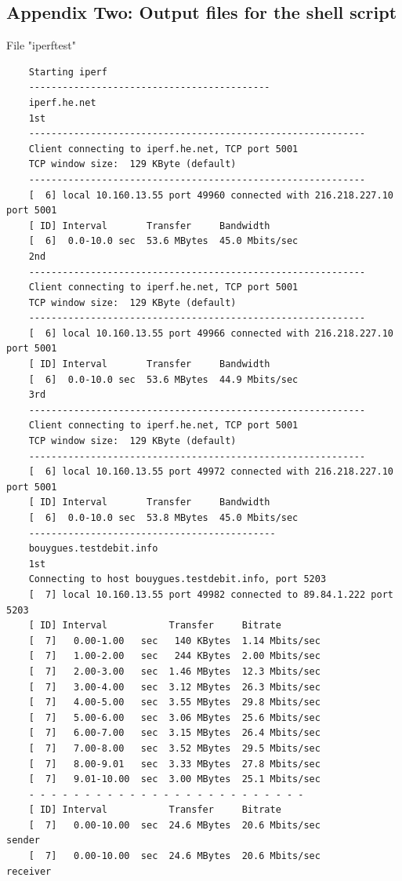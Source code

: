 \documentclass[paper=a4, fontsize=10pt]{scrartcl} %
\numberwithin{equation}{section} %
\numberwithin{figure}{section} %
\numberwithin{table}{section} %
\begin{document}
\subsection*{Appendix Two: Output files for the shell script}
File "iperftest"
\begin{lstlisting}
    Starting iperf
    -------------------------------------------
    iperf.he.net
    1st
    ------------------------------------------------------------
    Client connecting to iperf.he.net, TCP port 5001
    TCP window size:  129 KByte (default)
    ------------------------------------------------------------
    [  6] local 10.160.13.55 port 49960 connected with 216.218.227.10 port 5001
    [ ID] Interval       Transfer     Bandwidth
    [  6]  0.0-10.0 sec  53.6 MBytes  45.0 Mbits/sec
    2nd
    ------------------------------------------------------------
    Client connecting to iperf.he.net, TCP port 5001
    TCP window size:  129 KByte (default)
    ------------------------------------------------------------
    [  6] local 10.160.13.55 port 49966 connected with 216.218.227.10 port 5001
    [ ID] Interval       Transfer     Bandwidth
    [  6]  0.0-10.0 sec  53.6 MBytes  44.9 Mbits/sec
    3rd
    ------------------------------------------------------------
    Client connecting to iperf.he.net, TCP port 5001
    TCP window size:  129 KByte (default)
    ------------------------------------------------------------
    [  6] local 10.160.13.55 port 49972 connected with 216.218.227.10 port 5001
    [ ID] Interval       Transfer     Bandwidth
    [  6]  0.0-10.0 sec  53.8 MBytes  45.0 Mbits/sec
    --------------------------------------------
    bouygues.testdebit.info
    1st
    Connecting to host bouygues.testdebit.info, port 5203
    [  7] local 10.160.13.55 port 49982 connected to 89.84.1.222 port 5203
    [ ID] Interval           Transfer     Bitrate
    [  7]   0.00-1.00   sec   140 KBytes  1.14 Mbits/sec                  
    [  7]   1.00-2.00   sec   244 KBytes  2.00 Mbits/sec                  
    [  7]   2.00-3.00   sec  1.46 MBytes  12.3 Mbits/sec                  
    [  7]   3.00-4.00   sec  3.12 MBytes  26.3 Mbits/sec                  
    [  7]   4.00-5.00   sec  3.55 MBytes  29.8 Mbits/sec                  
    [  7]   5.00-6.00   sec  3.06 MBytes  25.6 Mbits/sec                  
    [  7]   6.00-7.00   sec  3.15 MBytes  26.4 Mbits/sec                  
    [  7]   7.00-8.00   sec  3.52 MBytes  29.5 Mbits/sec                  
    [  7]   8.00-9.01   sec  3.33 MBytes  27.8 Mbits/sec                  
    [  7]   9.01-10.00  sec  3.00 MBytes  25.1 Mbits/sec                  
    - - - - - - - - - - - - - - - - - - - - - - - - -
    [ ID] Interval           Transfer     Bitrate
    [  7]   0.00-10.00  sec  24.6 MBytes  20.6 Mbits/sec                  sender
    [  7]   0.00-10.00  sec  24.6 MBytes  20.6 Mbits/sec                  receiver
    

\end{lstlisting}
\end{document}
